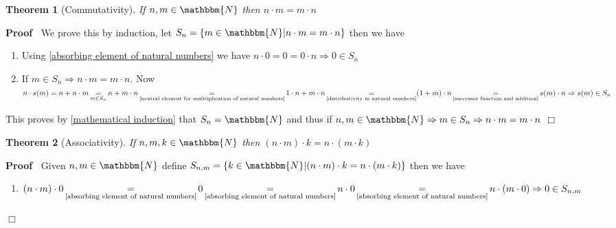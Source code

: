 \documentclass{book}
\newcommand{\equallim}{\mathop{=}\limits}
\newcommand{\nobracket}{}
\newcommand{\upl}{+}
\newenvironment{proof}{\noindent\textbf{Proof\ }}{\hspace*{\fill}$\Box$\medskip}
\newtheorem{theorem}{Theorem}
\begin{document}
{{\begin{theorem}[Commutativity]
  \label{multiplication of natural numbers is commutative}If $n, m \in
  \mathbbm{N}$ then $n \cdot m = m \cdot n$
\end{theorem}

\begin{proof}
  We prove this by induction, let $S_n = \{ m \in \mathbbm{N} | n \cdot m = m
  \cdot n \nobracket \}$ then we have
  \begin{enumerate}
    \item Using \ref{absorbing element of natural numbers} we have $n \cdot 0
    = 0 = 0 \cdot n \Rightarrow 0 \in S_n$
    
    \item If $m \in S_n \Rightarrow n \cdot m = m \cdot n$. Now $n \cdot s (m)
    = n + n \cdot m \equallim_{m \in S_n} n \upl m \cdot n
    \equallim_{\text{\ref{neutral element for mulitiplication of natural
    numbers}}} 1 \cdot n \upl m \cdot n \equallim_{\text{\ref{distributivity
    in natural numbers}}} (1 \upl m) \cdot n \equallim_{\text{\ref{successor
    function and addition}}} s (m) \cdot n \Rightarrow s (m) \in S_n$
  \end{enumerate}
  This proves by \ref{mathematical induction} that $S_n =\mathbbm{N}$ and thus
  if $n, m \in \mathbbm{N} \Rightarrow m \in S_n \Rightarrow n \cdot m = m
  \cdot n$
\end{proof}

\begin{theorem}[Associativity]
  \label{multiplication of natural numbers is associative}If $n, m, k \in
  \mathbbm{N}$ then $(n \cdot m) \cdot k = n \cdot (m \cdot k)$
\end{theorem}

\begin{proof}
  Given $n, m \in \mathbbm{N}$ define $S_{n, m} = \{ k \in \mathbbm{N} | (n
  \cdot m) \cdot k = n \cdot (m \cdot k) \nobracket \}$ then we have
  \begin{enumerate}
    \item $(n \cdot m) \cdot 0 \equallim_{\text{\ref{absorbing element of
    natural numbers}}} 0 \equallim_{\text{\ref{absorbing element of natural
    numbers}}} n \cdot 0 \equallim_{\text{\ref{absorbing element of natural
    numbers}}} n \cdot (m \cdot 0) \Rightarrow 0 \in S_{n, m}$
    

\end{enumerate}
\end{proof}}}
\end{document}
